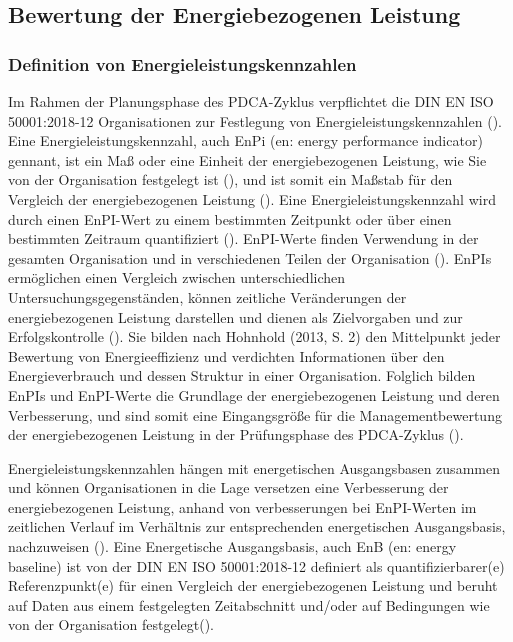 \subsection{Bewertung der Energiebezogenen Leistung}
\subsubsection{Definition von Energieleistungskennzahlen}
Im Rahmen der Planungsphase des PDCA-Zyklus verpflichtet die DIN EN ISO 50001:2018-12 Organisationen zur Festlegung von Energieleistungskennzahlen 
(\cite[S. 7]{DIN50001.2018}).
Eine Energieleistungskennzahl, auch EnPi (en: energy performance indicator) gennant, ist ein Maß oder eine Einheit der energiebezogenen Leistung, wie Sie von der Organisation festgelegt ist 
(\cite[Kapitel 3.4.4]{DIN50001.2018}), und ist somit ein Maßstab für den Vergleich der energiebezogenen Leistung (\cite[Kapitel A.6.4]{DIN50001.2018}). 
Eine Energieleistungskennzahl wird durch einen EnPI-Wert zu einem bestimmten Zeitpunkt oder über einen bestimmten Zeitraum quantifiziert (\cite[Kapitel 3.4.5]{DIN50001.2018}).
EnPI-Werte finden Verwendung in der gesamten Organisation und in verschiedenen Teilen der Organisation (\cite[S. 13]{DIN50006.2024}). 
EnPIs ermöglichen einen Vergleich zwischen unterschiedlichen Untersuchungsgegenständen, können zeitliche Veränderungen der energiebezogenen Leistung darstellen und dienen als 
Zielvorgaben und zur Erfolgskontrolle (\cite[S. 2]{Hohnhold.2013}).
Sie bilden nach Hohnhold (2013, S. 2) den Mittelpunkt jeder Bewertung von Energieeffizienz und verdichten Informationen über den Energieverbrauch und dessen Struktur in einer 
Organisation. 
Folglich bilden EnPIs und EnPI-Werte die Grundlage der energiebezogenen Leistung und deren Verbesserung, und sind somit eine Eingangsgröße für die Managementbewertung der energiebezogenen Leistung 
in der Prüfungsphase des PDCA-Zyklus (\cite[Kapitel 9.3.3]{DIN50001.2018}).

Energieleistungskennzahlen hängen mit energetischen Ausgangsbasen zusammen und können Organisationen in die Lage versetzen eine Verbesserung der energiebezogenen Leistung, anhand von verbesserungen bei EnPI-Werten 
im zeitlichen Verlauf im Verhältnis zur entsprechenden energetischen Ausgangsbasis, nachzuweisen (\cite[Kapitel 0.3]{DIN50001.2018}).
Eine Energetische Ausgangsbasis, auch EnB (en: energy baseline) ist von der DIN EN ISO 50001:2018-12 definiert als quantifizierbarer(e) Referenzpunkt(e) für einen Vergleich der energiebezogenen 
Leistung und beruht auf Daten aus einem festgelegten Zeitabschnitt und/oder auf Bedingungen wie von der Organisation festgelegt(\cite[Kapitel 3.4.7]{DIN50001.2018}). 

